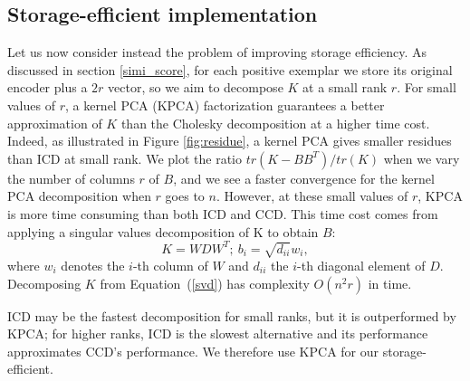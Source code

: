 \subsection{Storage-efficient implementation}\label{low-rank} %
Let us now consider instead the problem of improving storage efficiency. As discussed in section \ref{simi_score}, for each positive exemplar we store its original encoder plus a $2r$ vector, so we aim to decompose $K$ at a small rank $r$.
For small values of $r$, a kernel PCA (KPCA) factorization guarantees a better approximation of $K$ than the Cholesky decomposition at a higher time cost. Indeed, as illustrated in Figure \ref{fig:residue}, a kernel PCA gives smaller residues than ICD at small rank. We plot the ratio $tr(K-BB^T)/tr(K)$ when we vary the number of columns $r$ of $B$, and we see a faster convergence for the kernel PCA decomposition when $r$ goes to $n$. However, at these small values of $r$, KPCA is more time consuming than both ICD and CCD. This time cost comes from applying a singular values decomposition of K to obtain $B$:
\begin{equation}
    K = WDW^T; \ b_i = \sqrt{d_{ii}}w_i, \label{svd}
\end{equation}
where $w_i$ denotes the $i$-th column of $W$ and $d_{ii}$ the $i$-th diagonal element of $D$. Decomposing $K$ from Equation~(\ref{svd}) has complexity $O(n^2r)$ in time. 

ICD may be the fastest decomposition for small ranks, but it is outperformed by KPCA; for higher ranks, ICD is the slowest alternative and its performance approximates CCD's performance. We therefore use KPCA for our storage-efficient. %


